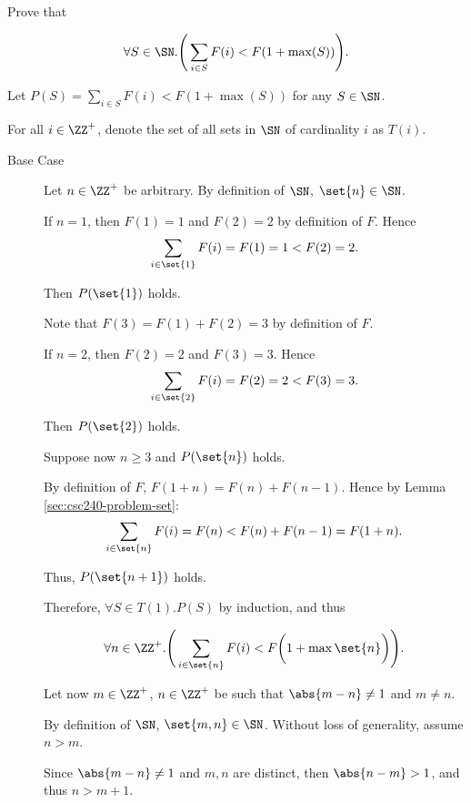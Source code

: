 \documentclass[11pt, letterpaper]{scrartcl}
\begin{document}
\begin{problem*}
  Prove that
  
  \begin{equation}
    \label{eq:1}
    \forall S\in\SN.\Bigg(\sum_{i\in S} F(i) < F(1+\max(S))\Bigg).
  \end{equation}

\end{problem*}
\begin{soln}
  \hfill

  Let $P(S) = \sum_{i\in S} F(i) < F(1+\max(S))$ for any $S\in\SN$.
  
  For all $i\in \ZZ^{+}$, denote the set of all sets in $\SN$ of
  cardinality $i$ as $T(i)$.

  \begin{description}

  \item[Base Case] \hfill

    Let $n\in\ZZ^{+}$ be arbitrary. By definition of $\SN$, $\set{n} \in \SN$.

    If $n=1$, then $F(1) = 1$ and $F(2)=2$ by definition of $F$. Hence
    \[\sum_{i\in \set{1}}F(i) = F(1) = 1 < F(2) = 2.\]

    Then $P(\set{1})$ holds.
    
    Note that $F(3) = F(1) + F(2) = 3$ by definition of $F$.

    If $n=2$, then $F(2) = 2$ and $F(3) = 3$. Hence
    \[\sum_{i\in \set{2}}F(i) = F(2) = 2 < F(3) = 3.\]

    Then $P(\set{2})$ holds.

    Suppose now $n\geq 3$ and $P(\set{n})$ holds.

    By definition of $F$, $F(1+n) = F(n) + F(n-1)$. Hence by Lemma \ref{sec:csc240-problem-set}:
    \[\sum_{i\in \set{n}} F(i)= F(n) < F(n) + F(n-1) = F(1+n).\]
    
    Thus, $P(\set{n+1})$ holds.

    Therefore, $\forall S\in T(1).P(S)$ by induction, and thus

    \[\forall n \in \ZZ^{+}.\Bigg(\sum_{i\in \set{n}} F(i) <
    F\bigg(1+\max\set{n}\bigg)\Bigg).\]

    Let now $m\in\ZZ^+$, $n\in\ZZ^{+}$ be such that $\abs{m-n}\neq 1$ and $m\neq n$.

    By definition of $\SN$, $\set{m, n}\in\SN$. Without loss of generality, assume $n>m$.

    Since $\abs{m-n}\neq 1$ and $m, n$ are distinct, then
    $\abs{n-m} > 1$, and thus $n>m+1$.


\end{description}
\end{soln}
\end{document}

